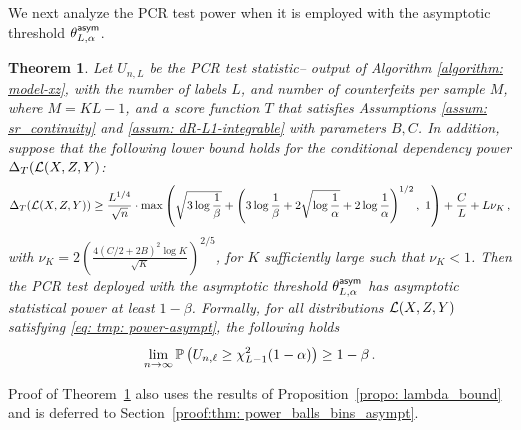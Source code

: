 \documentclass[11pt]{article}
\newtheorem{thm}[propo]{Theorem}
\begin{document}
 We next analyze the PCR test power when it is employed with the asymptotic threshold $\theta^{\mathsf{asym}}_{L,\alpha}$.
\begin{thm}\label{thm: power_balls_bins_asympt}
Let $U_{n,L}$ be the PCR test statistic-- output of Algorithm \ref{algorithm: model-xz}, with the number of labels $L$, and number of counterfeits per sample $M$, where $M= KL-1$, and a score function $T$ that satisfies Assumptions  \ref{assum: sr_continuity} and \ref{assum: dR-L1-integrable} with parameters $B,C$.  In addition, suppose that the following lower bound holds for the conditional dependency power $\Delta_{T}(\mathcal{L}(X,Z,Y) $:
\begin{equation}\label{eq: tmp: power-asympt}
\Delta_{T}(\mathcal{L}(X,Z,Y))\geq \frac{L^{1/4}}{\sqrt{n}}
\cdot\max\left(\sqrt{3\log\frac{1}{\beta}}+\left( 3\log\frac{1}{\beta} +  2\sqrt{\log\frac{1}{\alpha}}+2\log\frac{1}{\alpha} \right)^{1/2} ,~1  \right)+\frac{C}{L}+L\nu_K\,,
\end{equation}
with $\nu_K=2\left(\frac{4(C/2+2B)^2\log{K}}{\sqrt{K}}  \right)^{2/5}$, for $K$ sufficiently large such that $\nu_K<1$.  Then the PCR test deployed with the asymptotic threshold $\theta_{L,\alpha}^{\mathsf{asym}}$ has asymptotic statistical power at least $1-\beta$. Formally, for all distributions $\mathcal{L}(X,Z,Y)$ satisfying \eqref{eq: tmp: power-asympt}, the following holds
% 
 \[
 \lim\limits_{n\rightarrow \infty}^{}{\mathbb P}\left(U_{n,\ell} \geq \chi^2_{L-1}(1-\alpha) \right) \geq 1-\beta\,.
 \]
 \end{thm}
 
Proof of Theorem~\ref{thm: power_balls_bins_asympt} also uses the results of Proposition~\ref{propo: lambda_bound} and is deferred to Section~\ref{proof:thm: power_balls_bins_asympt}.
 
\end{document}
